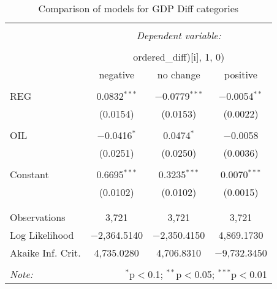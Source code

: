 
\begin{table}[!htbp] \centering 
  \caption{Comparison of models for GDP Diff categories} 
  \label{tbl:parallel} 
\begin{tabular}{@{\extracolsep{5pt}}lccc} 
\\[-1.8ex]\hline 
\hline \\[-1.8ex] 
 & \multicolumn{3}{c}{\textit{Dependent variable:}} \\ 
\cline{2-4} 
\\[-1.8ex] & \multicolumn{3}{c}{ordered\_diff)[i], 1, 0)} \\ 
 & negative & no change & positive \\ 
\hline \\[-1.8ex] 
 REG & 0.0832$^{***}$ & $-$0.0779$^{***}$ & $-$0.0054$^{**}$ \\ 
  & (0.0154) & (0.0153) & (0.0022) \\ 
  & & & \\ 
 OIL & $-$0.0416$^{*}$ & 0.0474$^{*}$ & $-$0.0058 \\ 
  & (0.0251) & (0.0250) & (0.0036) \\ 
  & & & \\ 
 Constant & 0.6695$^{***}$ & 0.3235$^{***}$ & 0.0070$^{***}$ \\ 
  & (0.0102) & (0.0102) & (0.0015) \\ 
  & & & \\ 
\hline \\[-1.8ex] 
Observations & 3,721 & 3,721 & 3,721 \\ 
Log Likelihood & $-$2,364.5140 & $-$2,350.4150 & 4,869.1730 \\ 
Akaike Inf. Crit. & 4,735.0280 & 4,706.8310 & $-$9,732.3450 \\ 
\hline 
\hline \\[-1.8ex] 
\textit{Note:}  & \multicolumn{3}{r}{$^{*}$p$<$0.1; $^{**}$p$<$0.05; $^{***}$p$<$0.01} \\ 
\end{tabular} 
\end{table}  
